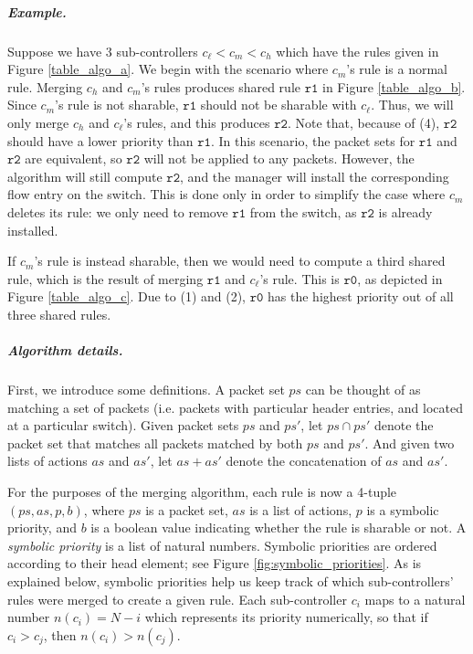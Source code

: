 \documentclass{article}
\begin{document}
\subparagraph{Example.} 
Suppose we have 3 sub-controllers $c_{\ell} < c_m < c_h$ which have the
rules given in Figure \ref{table_algo_a}. 
We begin with the scenario where $c_m$'s rule is a normal rule.
Merging $c_h$ and $c_m$'s rules produces shared rule $\texttt{r1}$ in 
Figure \ref{table_algo_b}.
Since $c_m$'s rule is not sharable, $\texttt{r1}$ should not be sharable
with $c_{\ell}$.
Thus, we will only merge $c_h$ and $c_{\ell}$'s rules, and this produces
$\texttt{r2}$. 
Note that, because of (4),
$\texttt{r2}$ should have a lower priority than $\texttt{r1}$. 
In this scenario, the packet sets for $\texttt{r1}$
and $\texttt{r2}$ are equivalent, so $\texttt{r2}$ will not be applied to 
any packets. However, the algorithm will still compute $\texttt{r2}$, and
the manager will install the corresponding flow entry on the switch.
This is done only in order to simplify 
the case where $c_m$ deletes its rule: we only need to remove $\texttt{r1}$
from the switch, as $\texttt{r2}$ is already installed.

If $c_m$'s rule is instead sharable, then we would need to compute a third
shared rule, which is the result of merging $\texttt{r1}$ and $c_{\ell}$'s
rule. This is $\texttt{r0}$, as depicted in Figure \ref{table_algo_c}.
Due to (1) and (2), $\texttt{r0}$ has the highest priority out of all three
shared rules. 

\subparagraph{Algorithm details.}

First, we introduce some definitions. 
A packet set $ps$ can be thought of as matching a set of packets
(i.e. packets with particular header entries, and located at a particular
switch).
Given packet sets $ps$ and $ps'$, let $ps \cap ps'$ denote the packet set 
that matches all packets matched by both $ps$ and $ps'$.
And given two lists of actions $as$ and $as'$, let $as + as'$ denote the
concatenation of $as$ and $as'$.

For the purposes of the merging algorithm, each rule is now a 4-tuple
$(ps, as, p, b)$, where $ps$ is a packet set, $as$ is a list of actions, 
$p$ is a symbolic priority, and $b$ is a boolean value indicating whether
the rule is sharable or not.
A \emph{symbolic priority} is a list of natural numbers.
Symbolic priorities are ordered according to their head element;
see Figure \ref{fig:symbolic_priorities}. 
As is explained below, symbolic priorities help
us keep track of which sub-controllers' rules were merged
to create a given rule. 
Each sub-controller $c_i$ maps to a natural number $n(c_i) = N-i$ 
which represents its priority numerically, so that if $c_i > c_j$,
then $n(c_i) > n(c_j)$.
\end{document}
